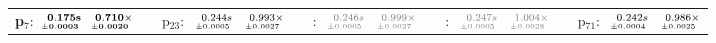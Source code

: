 \documentclass[a4paper,UKenglish]{lipics-v2016}
\begin{document}
\begin{table*}
\begin{adjustbox}{width=1.2\textwidth,center}
\begin{tabular}{rrrp{.1em}rrrp{.1em}rrrp{.1em}rrrp{.1em}rrr}
{\tiny \textbf{p$_{7}$}:}&$\substack{\mathmakebox[.7cm][r]{\mathbf{0.175}}\mathbf{s}\\{\mathmakebox[.7cm][r]{\scriptscriptstyle \mathbf{\pm 0.0003}}}}$&$\substack{\mathmakebox[.7cm][r]{\mathbf{0.710}}\mathbf{\times}\\{\mathmakebox[.7cm][r]{\scriptscriptstyle \mathbf{\pm 0.0020}}}}$&&{\tiny p$_{23}$:}&$\substack{\mathmakebox[.7cm][r]{0.244}s\\{\mathmakebox[.7cm][r]{\scriptscriptstyle \pm 0.0005}}}$&$\substack{\mathmakebox[.7cm][r]{0.993}\times\\{\mathmakebox[.7cm][r]{\scriptscriptstyle \pm 0.0027}}}$&&{\tiny \color{gray}{p$_{39}$}:}&$\substack{\mathmakebox[.7cm][r]{\color{gray}{0.246}}\color{gray}{s}\\{\mathmakebox[.7cm][r]{\scriptscriptstyle \color{gray}{\pm 0.0005}}}}$&$\substack{\mathmakebox[.7cm][r]{\color{gray}{0.999}}\color{gray}{\times}\\{\mathmakebox[.7cm][r]{\scriptscriptstyle \color{gray}{\pm 0.0027}}}}$&&{\tiny \color{gray}{p$_{55}$}:}&$\substack{\mathmakebox[.7cm][r]{\color{gray}{0.247}}\color{gray}{s}\\{\mathmakebox[.7cm][r]{\scriptscriptstyle \color{gray}{\pm 0.0005}}}}$&$\substack{\mathmakebox[.7cm][r]{\color{gray}{1.004}}\color{gray}{\times}\\{\mathmakebox[.7cm][r]{\scriptscriptstyle \color{gray}{\pm 0.0028}}}}$&&{\tiny p$_{71}$:}&$\substack{\mathmakebox[.7cm][r]{0.242}s\\{\mathmakebox[.7cm][r]{\scriptscriptstyle \pm 0.0004}}}$&$\substack{\mathmakebox[.7cm][r]{0.986}\times\\{\mathmakebox[.7cm][r]{\scriptscriptstyle \pm 0.0025}}}$\\

\end{tabular}
\end{adjustbox}
\end{table*}
\end{document}
